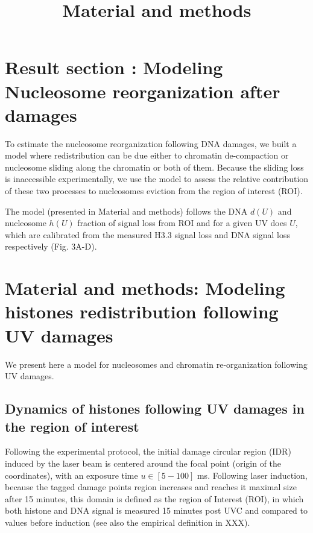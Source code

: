 \documentclass[12pt]{article}
\begin{document}
	
\title{ Material and methods}
\maketitle

\section{Result section : Modeling Nucleosome reorganization after damages}

To estimate the nucleosome reorganization following DNA damages, we built a model where redistribution can be due either to chromatin de-compaction or nucleosome sliding along the chromatin or both of them.  Because the sliding loss is inaccessible experimentally, we use the model to assess the relative contribution of these two processes to nucleosomes eviction from the region of interest (ROI).

The model (presented in Material and methods) follows the DNA $d(U)$ and nucleosome $h(U)$ fraction of signal loss from ROI and for a given UV does $U$, which are calibrated from the measured  H3.3 signal loss and DNA signal loss respectively (Fig. 3A-D). 


\section{Material and methods: Modeling  histones redistribution following UV damages}
We present here a model for nucleosomes and chromatin re-organization following UV damages. 

\subsection{Dynamics of histones following UV damages in the region of interest}
Following the experimental protocol, the initial damage circular region (IDR) induced by the laser beam is centered around the focal point (origin of the coordinates), with an exposure time $u \in [5-100]$ ms. Following laser induction, because the tagged damage points region increases and reaches it maximal size after 15 minutes, this domain is defined as the region of Interest (ROI), in which both histone and DNA signal is measured 15 minutes post UVC and compared to values before induction (see also the empirical definition in XXX). 
\end{document}
